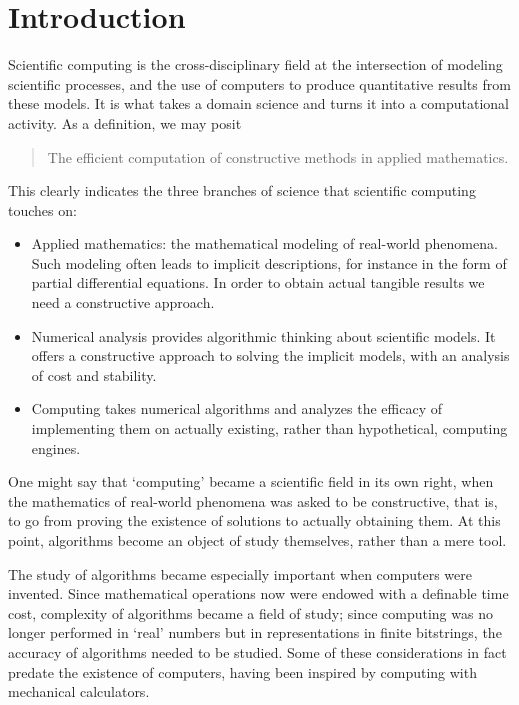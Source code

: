 \pagebreak
\thispagestyle{empty}
\section*{Introduction}

Scientific computing is the cross-disciplinary field at the
intersection of modeling scientific processes, and the use of
computers to produce quantitative results from these models.
It is what takes a domain science and turns it into a computational
activity.
%
As a definition, we may posit
\begin{quote}
  The efficient computation of constructive methods in applied mathematics.
\end{quote}
This clearly indicates the three branches of science that scientific
computing touches on:
\begin{itemize}
\item Applied mathematics: the mathematical modeling of real-world
  phenomena. Such modeling often leads to implicit descriptions, for
  instance in the form of partial differential equations. In order to
  obtain actual tangible results we need a constructive approach.
\item Numerical analysis provides algorithmic thinking about
  scientific models. It offers a constructive approach to solving the
  implicit models, with an analysis of cost and stability.
\item Computing takes numerical algorithms and analyzes the efficacy
  of implementing them on actually existing, rather than hypothetical,
  computing engines.
\end{itemize}

One might say that `computing' became a scientific field in its own
right, when the mathematics of real-world phenomena was asked to be
constructive, that is, to go from proving the existence of solutions
to actually obtaining them. At this point, algorithms become an object
of study themselves, rather than a mere tool.

The study of algorithms became especially important when computers were
invented. Since mathematical operations now were endowed with a
definable time cost, complexity of algorithms became a field of study;
since computing was no longer performed in `real' numbers but in
representations in finite bitstrings, the accuracy of algorithms
needed to be studied. Some of these considerations in fact predate the
existence of computers, having been inspired by computing with
mechanical calculators.

